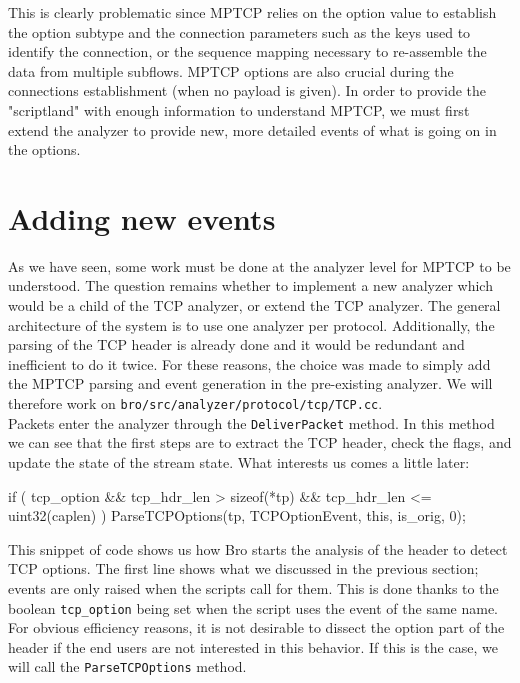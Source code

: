 This is clearly problematic since MPTCP relies on the option value to establish the option subtype and the connection parameters such as the keys used to identify the connection, or the sequence mapping necessary to re-assemble the data from multiple subflows. MPTCP options are also crucial during the connections establishment (when no payload is given). In order to provide the "scriptland" with enough information to understand MPTCP, we must first extend the analyzer to provide new, more detailed events of what is going on in the options.

\section{Adding new events}
As we have seen, some work must be done at the analyzer level for MPTCP to be understood. The question remains whether to implement a new analyzer which would be a child of the TCP analyzer, or extend the TCP analyzer. The general architecture of the system is to use one analyzer per protocol. Additionally, the parsing of the TCP header is already done and it would be redundant and inefficient to do it twice. For these reasons, the choice was made to simply add the MPTCP parsing and event generation in the pre-existing analyzer. We will therefore work on \texttt{bro/src/analyzer/protocol/tcp/TCP.cc}.\\

Packets enter the analyzer through the \texttt{DeliverPacket} method. In this method we can see that the first steps are to extract the TCP header, check the flags, and update the state of the stream state. What interests us comes a little later:

\begin{code}[language = C++]
	if ( tcp_option && tcp_hdr_len > sizeof(*tp) &&
	     tcp_hdr_len <= uint32(caplen) )
		ParseTCPOptions(tp, TCPOptionEvent, this, is_orig, 0);
\end{code}

This snippet of code shows us how Bro starts the analysis of the header to detect TCP options. The first line shows what we discussed in the previous section; events are only raised when the scripts call for them. This is done thanks to the boolean \texttt{tcp\_option} being set when the script uses the event of the same name. For obvious efficiency reasons, it is not desirable to dissect the option part of the header if the end users are not interested in this behavior. If this is the case, we will call the \texttt{ParseTCPOptions} method. \\


